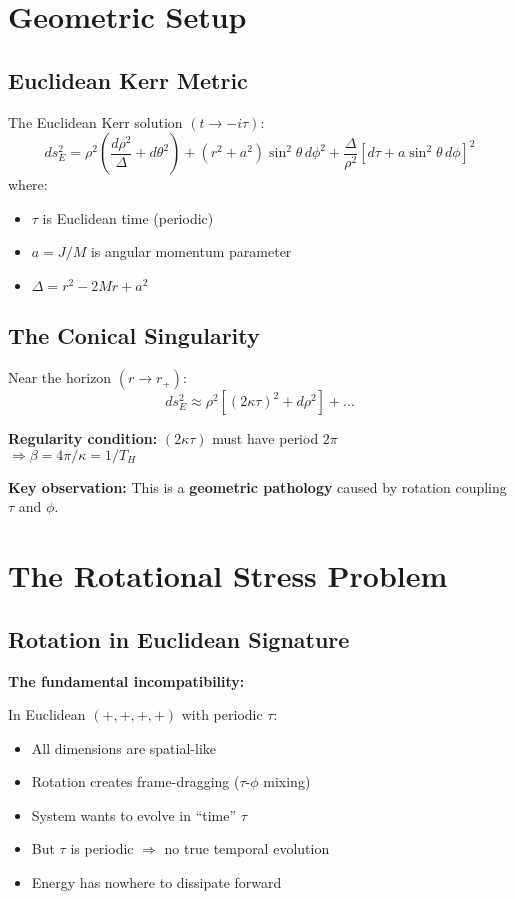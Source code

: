\documentclass[11pt]{article}
\begin{document}
\section{Geometric Setup}

\subsection{Euclidean Kerr Metric}

The Euclidean Kerr solution $(t \to -i\tau)$:
\begin{equation}
ds^2_E = \rho^2\left(\frac{d\rho^2}{\Delta} + d\theta^2\right) + (r^2+a^2)\sin^2\theta\, d\phi^2 + \frac{\Delta}{\rho^2}[d\tau + a\sin^2\theta\, d\phi]^2
\end{equation}
where:
\begin{itemize}
\item $\tau$ is Euclidean time (periodic)
\item $a = J/M$ is angular momentum parameter
\item $\Delta = r^2 - 2Mr + a^2$
\end{itemize}

\subsection{The Conical Singularity}

Near the horizon $(r \to r_+)$:
\begin{equation}
ds^2_E \approx \rho^2[(2\kappa\tau)^2 + d\rho^2] + \ldots
\end{equation}

\textbf{Regularity condition:} $(2\kappa\tau)$ must have period $2\pi$ \\
$\Rightarrow \beta = 4\pi/\kappa = 1/T_H$

\textbf{Key observation:} This is a \textbf{geometric pathology} caused by rotation coupling $\tau$ and $\phi$.

\section{The Rotational Stress Problem}

\subsection{Rotation in Euclidean Signature}

\textbf{The fundamental incompatibility:}

In Euclidean $(+,+,+,+)$ with periodic $\tau$:
\begin{itemize}
\item All dimensions are spatial-like
\item Rotation creates frame-dragging ($\tau$-$\phi$ mixing)
\item System wants to evolve in ``time'' $\tau$
\item But $\tau$ is periodic $\Rightarrow$ no true temporal evolution
\item Energy has nowhere to dissipate forward
\end{itemize}
\end{document}
